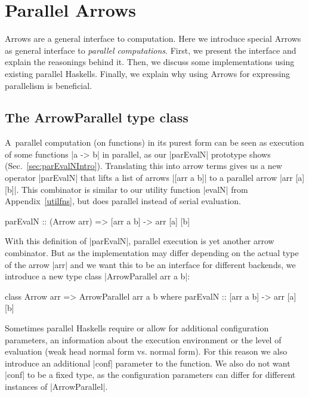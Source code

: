 \section{Parallel Arrows}
\label{sec:parallel-arrows}
Arrows are a general interface to computation. Here we introduce special Arrows as general interface to \textit{parallel computations}. First, we present the interface and explain the reasonings behind it. Then, we discuss some implementations using existing parallel Haskells. Finally, we explain why using Arrows for expressing parallelism is beneficial.
\subsection{The ArrowParallel type class}
A~parallel computation (on functions) in its purest form can be seen as execution of some functions |a -> b| in parallel, as our |parEvalN| prototype shows (Sec.~\ref{sec:parEvalNIntro}).
Translating this into arrow terms gives us a new operator |parEvalN| that lifts a list of arrows |[arr a b]| to a parallel arrow |arr [a] [b]|. %
This combinator is similar to our utility function |evalN| from Appendix~\ref{utilfns}, but does parallel instead of serial evaluation.
\begin{code}
parEvalN :: (Arrow arr) => [arr a b] -> arr [a] [b]
\end{code}
With this definition of |parEvalN|, parallel execution is yet another arrow combinator. But as the implementation may differ depending on the actual type of the arrow |arr| and we want this to be an interface for different backends, we introduce a new type class |ArrowParallel arr a b|: %
\begin{code}
class Arrow arr => ArrowParallel arr a b where
	parEvalN :: [arr a b] -> arr [a] [b]
\end{code}
Sometimes parallel Haskells require or allow for additional configuration parameters, \eg an information about the execution environment or the level of evaluation (weak head normal form vs. normal form). For this reason we also introduce an additional |conf| parameter to the function. We also do not want |conf| to be a fixed type, as the configuration parameters can differ for different instances of |ArrowParallel|. %
